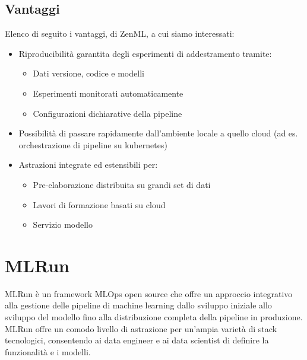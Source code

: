 \documentclass[12pt,a4paper]{report}
\begin{document}
\subsection{Vantaggi}
Elenco di seguito i vantaggi, di ZenML, a cui siamo interessati:
\begin{itemize}
    \item Riproducibilità garantita degli esperimenti di addestramento tramite:
    \begin{itemize}
        \item Dati versione, codice e modelli
        \item Esperimenti monitorati automaticamente
        \item Configurazioni dichiarative della pipeline
    \end{itemize}
    \item Possibilità di passare rapidamente dall'ambiente locale a quello cloud (ad es. orchestrazione di pipeline su kubernetes)
    \item Astrazioni integrate ed estensibili per:
    \begin{itemize}
        \item Pre-elaborazione distribuita su grandi set di dati
        \item Lavori di formazione basati su cloud        
        \item Servizio modello
    \end{itemize}
\end{itemize}


\section{MLRun}
MLRun è un framework MLOps open source che offre un approccio integrativo alla gestione delle pipeline di machine learning dallo sviluppo iniziale allo sviluppo del modello fino alla distribuzione completa della pipeline in produzione. MLRun offre un comodo livello di astrazione per un'ampia varietà di stack tecnologici, consentendo ai data engineer e ai data scientist di definire la funzionalità e i modelli.\\
\end{document}
